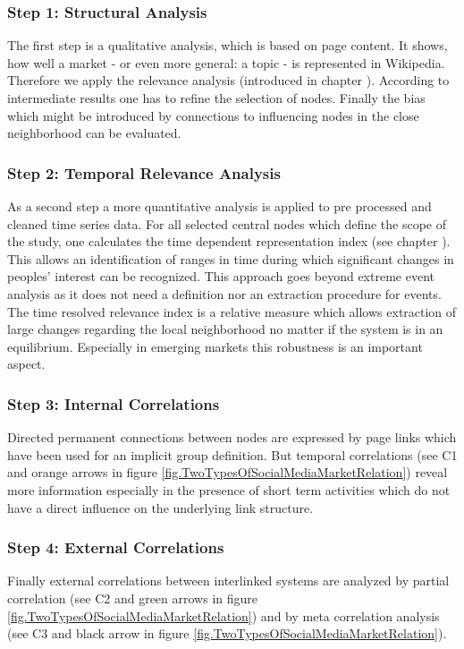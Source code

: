 \documentclass[a4paper,10pt]{scrbook}
\begin{document}
\subsubsection*{Step 1: Structural Analysis}
The first step is a qualitative analysis, which is based on page content. It shows, how well a market - or even more general: a topic - is represented in Wikipedia. Therefore we apply the relevance analysis (introduced in chapter \label{chap.ContextsensitiveRelevance}). According to intermediate results one has to refine the selection of nodes. Finally the bias which might be introduced by connections to influencing nodes in the close neighborhood can be evaluated.\\

\subsubsection*{Step 2: Temporal Relevance Analysis}
As a second step a more quantitative analysis is applied to pre processed and cleaned time series data. For all selected central nodes which define the scope of the study, one calculates the time dependent representation index (see chapter \label{chap.TRI}). This allows an identification of ranges in time during which significant changes in peoples' interest can be recognized. This approach goes beyond extreme event analysis as it does not need a definition nor an extraction procedure for events. The time resolved relevance index is a relative measure which allows extraction of large changes regarding the local neighborhood no matter if the system is in an equilibrium. Especially in emerging markets this robustness is an important aspect.\\

\subsubsection*{Step 3: Internal Correlations}
Directed permanent connections between nodes are expressed by page links which have been used for an implicit group definition. But temporal correlations (see C1 and orange arrows in figure \ref{fig.TwoTypesOfSocialMediaMarketRelation}) reveal more information especially in the presence of short term activities which do not have a direct influence on the underlying link structure. 

\subsubsection*{Step 4: External Correlations}
Finally external correlations between interlinked systems are analyzed by partial correlation (see C2 and green arrows in figure \ref{fig.TwoTypesOfSocialMediaMarketRelation}) and by meta correlation analysis (see C3 and black arrow in figure \ref{fig.TwoTypesOfSocialMediaMarketRelation}). 
\end{document}
